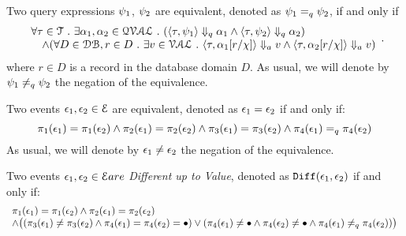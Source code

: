 \begin{defn}
%
\label{def:query_equal}
Two query expressions $\psi_1$, $\psi_2$ are equivalent, denoted as $\psi_1 =_{q} \psi_2$, if and only if
$$
 \begin{array}{l} 
   \forall \mathtt{\tau} \in \mathcal{T} ~.~ \exists \alpha_1, \alpha_2 \in \mathcal{QVAL} ~.~
    (\langle \mathtt{\tau},  \psi_1 \rangle \Downarrow_q \alpha_1 \land \langle \mathtt{\tau},  \psi_2  \rangle \Downarrow_q \alpha_2) 
    \\
    \quad \land (\forall D \in \mathcal{DB}, r \in D ~.~ 
    \exists v \in \mathcal{VAL} ~.~ 
          \langle \mathtt{\tau}, \alpha_1[r/\chi] \rangle \Downarrow_a v \land \langle \mathtt{\tau},  \alpha_2[r/\chi]  \rangle \Downarrow_a v)  
  \end{array}.
$$
 where $r \in D$ is a record in the database domain $D$. 
 As usual, we will denote by $\psi_1 \neq_{q} \psi_2$  the negation of the equivalence.
\end{defn}
%
\begin{defn}
  Two events $\mathtt{\epsilon}_1, \mathtt{\epsilon}_2 \in \mathcal{E}$ are equivalent, 
  denoted as $\mathtt{\epsilon}_1 = \mathtt{\epsilon}_2$ 
  if and only if:
  \[
  \pi_1(\mathtt{\epsilon}_1) = \pi_1(\mathtt{\epsilon}_2) 
  \land  
  \pi_2(\mathtt{\epsilon}_1) = \pi_2(\mathtt{\epsilon}_2) 
  \land
  \pi_{3}(\mathtt{\epsilon}_1) = \pi_{3}(\mathtt{\epsilon}_2)
  \land 
  \pi_{4}(\mathtt{\epsilon}_1) =_q \pi_{4}(\mathtt{\epsilon}_2)
  \]
  As usual, we will denote by $\mathtt{\epsilon}_1 \neq \mathtt{\epsilon}_2$  the negation of the equivalence.
\end{defn}


\begin{defn}
  Two events $\mathtt{\epsilon}_1, \mathtt{\epsilon}_2 \in \mathcal{E} are $ \emph{Different up to Value}, 
  denoted as $\mathtt{Diff}(\mathtt{\epsilon}_1, \mathtt{\epsilon}_2)$ if and only if:
  \[
    \begin{array}{l}
  \pi_1(\mathtt{\epsilon}_1) = \pi_1(\mathtt{\epsilon}_2) 
  \land  
  \pi_2(\mathtt{\epsilon}_1) = \pi_2(\mathtt{\epsilon}_2) \\
  \land  
  \big(
    (\pi_3(\mathtt{\epsilon}_1) \neq \pi_3(\mathtt{\epsilon}_2)
  \land 
  \pi_{4}(\mathtt{\epsilon}_1) = \pi_{4}(\mathtt{\epsilon}_2) = \bullet )
  \lor 
  (\pi_4(\mathtt{\epsilon}_1) \neq \bullet
  \land 
  \pi_4(\mathtt{\epsilon}_2) \neq \bullet
  \land 
  \pi_{4}(\mathtt{\epsilon}_1) \neq_q \pi_{4}(\mathtt{\epsilon}_2)) 
  \big)
  \end{array}
  \]
  \end{defn}
